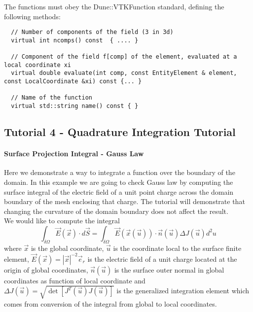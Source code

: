 \noindent
The functions must obey the Dune::VTKFunction standard, defining the following methods: \\

\begin{mybox}
\begin{lstlisting}    
  // Number of components of the field (3 in 3d)
  virtual int ncomps() const  { .... }
  
  // Component of the field f[comp] of the element, evaluated at a local coordinate xi
  virtual double evaluate(int comp, const EntityElement & element, const LocalCoordinate &xi) const {... }
  
  // Name of the function
  virtual std::string name() const { }
\end{lstlisting}
\end{mybox}



\subsection{Tutorial 4 - Quadrature Integration Tutorial}
\label{usage-howto-tutorial-integration-quadrature}

\paragraph{Surface Projection Integral - Gauss Law}
Here we demonstrate a way to integrate a function over the boundary of the domain. In this example we are going to check Gauss law by computing the surface integral of the electric field of a unit point charge across the domain boundary of the mesh enclosing that charge. The tutorial will demonstrate that changing the curvature of the domain boundary does not affect the result. \\

\noindent
We would like to compute the integral
\[\int_{\delta \Omega} \vec{E}(\vec{x}) \cdot d\vec{S} = \int_{\delta \Omega} \vec{E}(\vec{x}(\vec{u})) \cdot \vec{n}(\vec{u}) \Delta J(\vec{u}) d^2 u \]
\noindent
where $\vec{x}$ is the global coordinate, $\vec{u}$ is the coordinate local to the surface finite element, $\vec{E}(\vec{x}) = |\vec{x}|^{-2} \vec{e}_r$ is the electric field of a unit charge located at the origin of global coordinates, $\vec{n}(\vec{u})$ is the surface outer normal in global coordinates as function of local coordinate and $\Delta J(\vec{u}) = \sqrt{\det [ J^T(\vec{u}) J(\vec{u}) ]}$ is the generalized integration element which comes from conversion of the integral from global to local coordinates. \\

